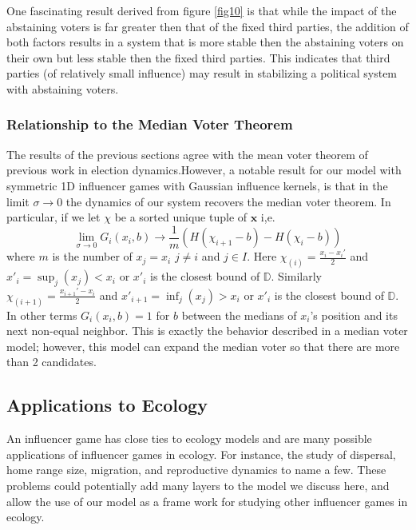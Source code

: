 \documentclass{article}
\newcommand {\D}{\mathbb{D}}
\begin{document}
        One fascinating result derived from figure \cref{fig10} is that while the impact of the abstaining voters is far greater then that of the fixed third parties, the addition of both factors results in a system that is more stable then the abstaining voters on their own but less stable then the fixed third parties. This indicates that third parties (of relatively small influence) may result in stabilizing a political system with abstaining voters. 



        
          \subsubsection{Relationship to the Median Voter Theorem}
            The results of the previous sections agree with the mean voter theorem of previous work in election dynamics.However, a notable result for our model with symmetric 1D influencer games with Gaussian influence kernels, is that in the limit $\sigma\to0$ the dynamics of our system recovers the median voter theorem. In particular, if we let $\chi$ be a sorted unique tuple of $\mathbf{x}$ i,e. 
            \begin{equation}
                \lim_{\sigma\to0}G_i(x_i,b)\to \frac{1}{m}(H(\chi_{i+1}-b)-H(\chi_{i}-b))
            \end{equation}
            where $m$ is the number of $x_j=x_i$ $j\neq i$ and $j\in I$. Here $\chi_{(i)}=\frac{x_{i}-x_{i}'}{2}$ and $x'_{i}=\sup_j(x_{j})<x_i$ or $x'_i$ is the closest bound of $\D$. Similarly $\chi_{(i+1)}=\frac{x_{i+1}'-x_{i}}{2}$ and $x'_{i+1}=\inf_j(x_{j})>x_i$ or $x'_i$ is the closest bound of $\D$. In other terms $G_i(x_i,b)=1$ for $b$ between the medians of $x_i$'s position and its next non-equal neighbor. This is exactly the behavior described in a median voter model; however, this model can expand the median voter so that there are more than 2 candidates. 


    
        \subsection{Applications to Ecology}
            An influencer game has close ties to ecology models and are many possible applications of influencer games in ecology. For instance, the study of dispersal, home range size, migration, and reproductive dynamics to name a few. These problems could potentially add many layers to the model we discuss here, and allow the use of our model as a frame work for studying other influencer games in ecology.  
\end{document}
